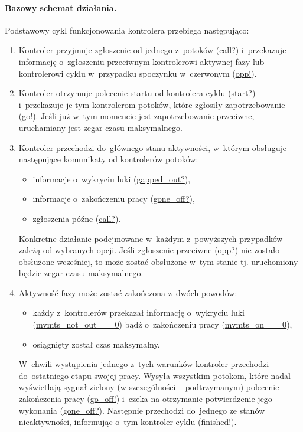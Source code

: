 \documentclass{pracamgr}
\theoremstyle{plain}
\begin{document}
\paragraph{Bazowy schemat działania.} Podstawowy cykl funkcjonowania
kontrolera przebiega następująco:
\begin{enumerate}
  \item Kontroler przyjmuje zgłoszenie od jednego z~potoków (\url{call?})
  i~przekazuje informację o~zgłoszeniu przeciwnym kontrolerowi aktywnej
  fazy lub kontrolerowi cyklu w~przypadku spoczynku w~czerwonym (\url{opp!}).
  \item Kontroler otrzymuje polecenie startu od kontrolera cyklu
  (\url{start?}) i~przekazuje je tym kontrolerom potoków, które
  zgłosiły zapotrzebowanie (\url{go!}). Jeśli już w~tym momencie jest
  zapotrzebowanie przeciwne, uruchamiany jest zegar czasu
  maksymalnego.
  \item Kontroler przechodzi do~głównego stanu aktywności, w~którym obsługuje
  następujące komunikaty od kontrolerów potoków:
  \begin{itemize}
    \item informacje o~wykryciu luki (\url{gapped_out?}),
    \item informacje o~zakończeniu pracy (\url{gone_off?}),
    \item zgłoszenia późne (\url{call?}).
  \end{itemize}
  Konkretne działanie podejmowane w~każdym z~powyższych przypadków
  zależą od wybranych opcji. Jeśli zgłoszenie przeciwne
  (\url{opp?}) nie zostało obsłużone wcześniej, to może zostać
  obsłużone w~tym stanie tj. uruchomiony będzie zegar czasu
  maksymalnego.
  \item Aktywność fazy może zostać zakończona z~dwóch powodów:
  \begin{itemize}
    \item każdy z~kontrolerów przekazał informację o~wykryciu luki
    (\url{mvmts_not_out == 0}) bądź o~zakończeniu pracy
    (\url{mvmts_on == 0}),
    \item osiągnięty został czas maksymalny.
  \end{itemize}
  W~chwili wystąpienia jednego z~tych warunków kontroler przechodzi
  do~ostatniego etapu swojej pracy. Wysyła wszystkim potokom, które nadal
  wyświetlają sygnał zielony (w szczególności -- podtrzymanym)
  polecenie zakończenia pracy (\url{go_off!}) i~czeka na otrzymanie
  potwierdzenie jego wykonania (\url{gone_off?}). Następnie przechodzi
  do~jednego ze stanów nieaktywności, informując o~tym kontroler cyklu
  (\url{finished!}).
\end{enumerate}
\end{document}
